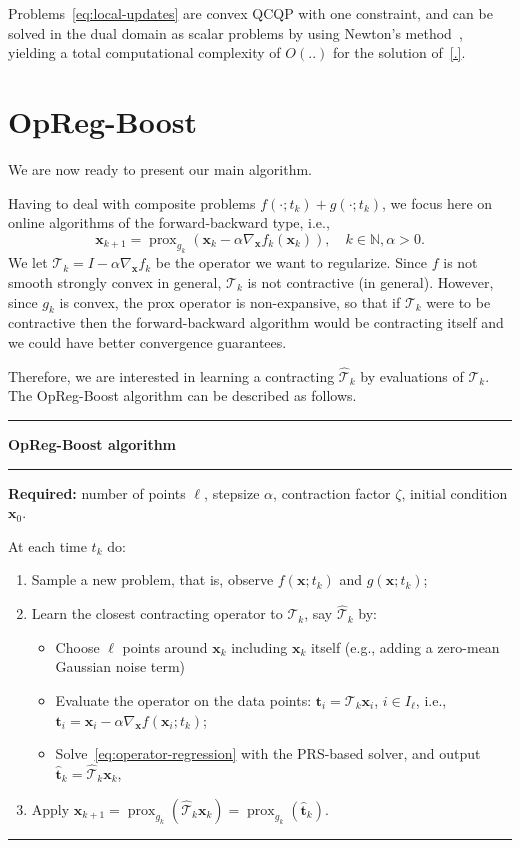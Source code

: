 \documentclass{article}
\DeclareMathOperator{\prox}{prox}
\newcommand{\N}{\mathbb{N}}
\newcommand{\tv}{\mathbold{t}}
\newcommand{\x}{\mathbold{x}}
\newcommand{\T}{\mathcal{T}}
\begin{document}
Problems~\eqref{eq:local-updates} are convex QCQP with one constraint, and can be solved in the dual domain as scalar problems by using Newton's method~\cite{.}, yielding a total computational complexity of $O(..)$ for the solution of~\eqref{.}.

\section{OpReg-Boost}\label{sec:online-opreg}

We are now ready to present our main algorithm. 

Having to deal with composite problems $f(\cdot; t_k) + g(\cdot; t_k)$, we focus here on online algorithms of the forward-backward type, i.e., 
\begin{equation}
\x_{k+1} = \prox_{g_k} (\x_k - \alpha \nabla_{\x} f_k(\x_k)), \quad k \in \N, \alpha >0.
\end{equation}
We let $\T_k = I - \alpha \nabla_{\x} f_k$ be the operator we want to regularize. Since $f$ is not smooth strongly convex in general, $\T_k$ is not contractive (in general). However, since $g_k$ is convex, the prox operator is non-expansive, so that if $\T_k$ were to be contractive then the forward-backward algorithm would be contracting itself and we could have better convergence guarantees. 

Therefore, we are interested in learning a contracting $\hat{\T}_k$ by evaluations of $\T_k$. The OpReg-Boost algorithm can be described as follows. 

\smallskip
\smallskip
\hrule
{\bf OpReg-Boost algorithm}
\smallskip
\hrule
{\bf Required:} number of points $\ell$, stepsize $\alpha$, contraction factor $\zeta$, initial condition $\x_0$.

At each time $t_k$ do:
\begin{enumerate}
	\item Sample a new problem, that is, observe $f(\x; t_k)$ and $g(\x; t_k)$;
	\item Learn the closest contracting operator to $\T_{k}$, say $\hat{\T}_k$ by:
	\begin{itemize}
		\item Choose $\ell$ points around $\x_k$ including $\x_k$ itself (e.g., adding a zero-mean Gaussian noise term)
		\item Evaluate the operator on the data points: $\tv_i = \T_{k} \x_i$, $i\in I_{\ell}$, i.e., $\tv_i = \x_i - \alpha \nabla_{\x} f(\x_i; t_k)$;
		\item Solve~\eqref{eq:operator-regression} with the PRS-based solver, and output $\hat{\tv}_k = \hat{\T}_k \x_k$,
\end{itemize}
	\item Apply $\x_{k+1} = \prox_{g_k} (\hat{\T}_k \x_k) = \prox_{g_k} (\hat{\tv}_k) $.
\end{enumerate}
\smallskip
\hrule
\end{document}
